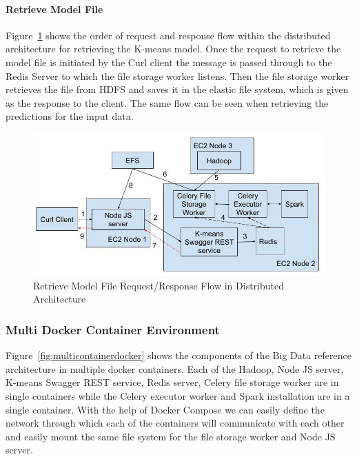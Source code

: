 \paragraph{Retrieve Model File}

Figure~\ref{fig:retrievemodelfiledistributed} shows the order of request and 
response flow within the distributed architecture for retrieving the K-means 
model. Once the request to retrieve the model file is initiated by the Curl 
client the message is passed through to the Redis Server to which the file 
storage worker listens. Then the file storage worker retrieves the file from 
HDFS and saves it in the elastic file system, which is given as the response 
to the client. The same flow can be seen when retrieving the predictions for 
the input data. 

\begin{figure}[htbp] 
	\centering
	\includegraphics[width=\columnwidth]{images/ec2getkmeansmodel.jpg}
	\caption{Retrieve Model File Request/Response Flow in Distributed 
	Architecture}
\label{fig:retrievemodelfiledistributed} 
\end{figure}

\subsubsection{Multi Docker Container Environment}

Figure~\ref{fig:multicontainerdocker} shows the components of the Big Data 
reference architecture in multiple docker containers. Each of the Hadoop, Node 
JS server, K-means Swagger REST service, Redis server, Celery file storage 
worker are in single containers while the Celery executor worker and Spark 
installation are in a single container. With the help of Docker Compose we can 
easily define the network through which each of the containers will 
communicate with each other and easily mount the same file system for the file 
storage worker and Node JS server. 

